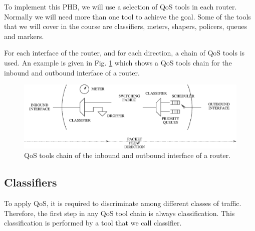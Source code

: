To implement this PHB, we will use a selection of QoS tools in each router.
Normally we will need more than one tool to achieve the goal.
Some of the tools that we will cover in the course are classifiers, meters, shapers, policers, queues and markers.

For each interface of the router, and for each direction, a chain of QoS tools is used.
An example is given in Fig. \ref{fig:qos-chain} which shows a QoS tools chain for the inbound and outbound interface of a router.

\begin{figure}[h]
\centering
\includegraphics[width=\linewidth]{figures/qos_chain.eps}
\caption{QoS tools chain of the inbound and outbound interface of a router.}
\label{fig:qos-chain}
\end{figure}

\subsection{Classifiers}

To apply QoS, it is required to discriminate among different classes of traffic.
Therefore, the first step in any QoS tool chain is always classification.
This classification is performed by a tool that we call classifier.

